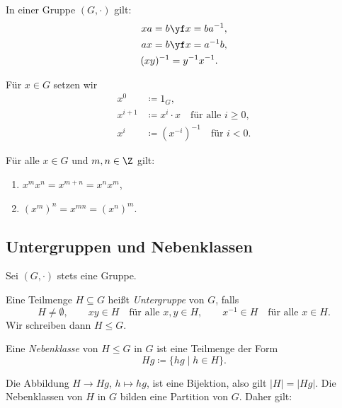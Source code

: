 \documentclass[11pt]{article}
\begin{document}
\begin{note}[Rechenregeln]\Theorem
  In einer Gruppe $(G, \cdot)$ gilt:
  \begin{align*}
    xa = b &\yf x = ba^{-1}, \\
    ax = b &\yf x = a^{-1}b, \\
    (xy)^{-1} &= y^{-1}x^{-1}.
  \end{align*}
\end{note}

\begin{definition}[Potenzen]\Theorem
  Für $x \in G$ setzen wir
  \begin{align*}
    x^0 &\coloneqq 1_G, \\
    x^{i+1} &\coloneqq x^i \cdot x \quad \text{für alle } i \ge 0, \\
    x^i &\coloneqq (x^{-i})^{-1} \quad \text{für } i < 0.
  \end{align*}
\end{definition}

\begin{lemma}[Potenzrechenregeln]\Theorem
  Für alle $x \in G$ und $m, n \in \Z$ gilt:
  \begin{enumerate}[label=(\roman*)]
    \item $x^m x^n = x^{m+n} = x^n x^m$,
    \item $(x^m)^n = x^{mn} = (x^n)^m$.
  \end{enumerate}
\end{lemma}


\subsection{Untergruppen und Nebenklassen}

Sei $(G, \cdot)$ stets eine Gruppe.

\begin{definition}[Untergruppe]\Theorem
  Eine Teilmenge $H \subseteq G$ heißt \emph{Untergruppe} von $G$, falls
  \[ H \neq \emptyset, \qquad xy \in H \quad \text{für alle } x, y \in H, \qquad x^{-1} \in H \quad \text{für alle } x \in H. \]
  Wir schreiben dann $H \le G$.
\end{definition}


\begin{definition}[Nebenklasse]\Theorem
  Eine \emph{Nebenklasse} von $H \le G$ in $G$ ist eine Teilmenge der Form
  \[ Hg \coloneqq \{hg \mid h \in H\}. \]
\end{definition}

Die Abbildung $H \to Hg$, $h \mapsto hg$, ist eine Bijektion, also gilt $\lvert H \rvert = \lvert Hg \rvert$.
Die Nebenklassen von $H$ in $G$ bilden eine Partition von $G$. Daher gilt:
\end{document}
